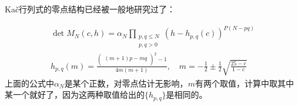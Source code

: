 Ka\v{c}行列式的零点结构已经被一般地研究过了：
\begin{theorem}
	\begin{equation}
		\boxed{
			\begin{gathered}%
				\det M_N(c,h)=\alpha_N\prod_{\substack{p,q\leq N\\p,q>0}}\left(h-h_{p,q}(c)\right)^{P(N-pq)}\\%
			h_{p,q}(m)=\frac{\left(\begin{array}{c}(m+1)p-mq\\\end{array}\right)^2-1}{4m(m+1)},\quad m=-\frac12\pm\frac12\sqrt{\frac{25-c}{1-c}}
			\end{gathered}
		}
	\end{equation}
	上面的公式中$\alpha_N$是某个正数，对零点估计无影响，$m$有两个取值，计算中取其中某一个就好了，因为这两种取值给出的$\{h_{p,q}\}$是相同的。
\end{theorem}
